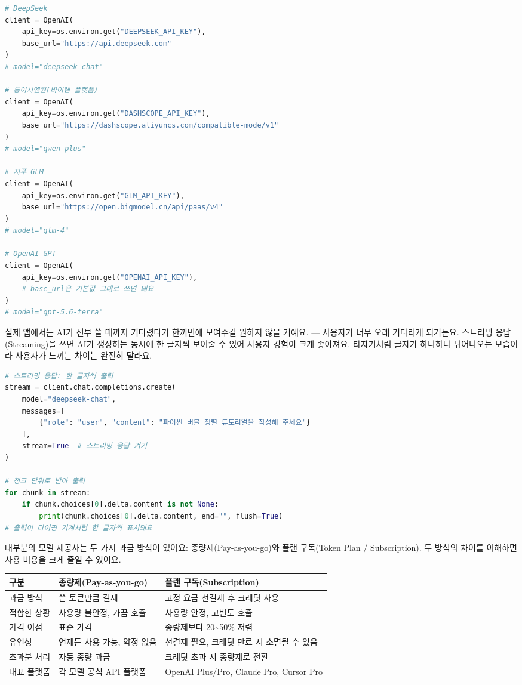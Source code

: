 \begin{lstlisting}[language=Python]
# DeepSeek
client = OpenAI(
    api_key=os.environ.get("DEEPSEEK_API_KEY"),
    base_url="https://api.deepseek.com"
)
# model="deepseek-chat"

# 퉁이치엔원(바이롄 플랫폼)
client = OpenAI(
    api_key=os.environ.get("DASHSCOPE_API_KEY"),
    base_url="https://dashscope.aliyuncs.com/compatible-mode/v1"
)
# model="qwen-plus"

# 지푸 GLM
client = OpenAI(
    api_key=os.environ.get("GLM_API_KEY"),
    base_url="https://open.bigmodel.cn/api/paas/v4"
)
# model="glm-4"

# OpenAI GPT
client = OpenAI(
    api_key=os.environ.get("OPENAI_API_KEY"),
    # base_url은 기본값 그대로 쓰면 돼요
)
# model="gpt-5.6-terra"
\end{lstlisting}


실제 앱에서는 AI가 전부 쓸 때까지 기다렸다가 한꺼번에 보여주길 원하지 않을 거예요. — 사용자가 너무 오래 기다리게 되거든요. 스트리밍 응답(Streaming)을 쓰면 AI가 생성하는 동시에 한 글자씩 보여줄 수 있어 사용자 경험이 크게 좋아져요. 타자기처럼 글자가 하나하나 튀어나오는 모습이라 사용자가 느끼는 차이는 완전히 달라요.

\begin{lstlisting}[language=Python]
# 스트리밍 응답: 한 글자씩 출력
stream = client.chat.completions.create(
    model="deepseek-chat",
    messages=[
        {"role": "user", "content": "파이썬 버블 정렬 튜토리얼을 작성해 주세요"}
    ],
    stream=True  # 스트리밍 응답 켜기
)

# 청크 단위로 받아 출력
for chunk in stream:
    if chunk.choices[0].delta.content is not None:
        print(chunk.choices[0].delta.content, end="", flush=True)
# 출력이 타이핑 기계처럼 한 글자씩 표시돼요
\end{lstlisting}


대부분의 모델 제공사는 두 가지 과금 방식이 있어요: 종량제(Pay-as-you-go)와 플랜 구독(Token Plan / Subscription). 두 방식의 차이를 이해하면 사용 비용을 크게 줄일 수 있어요.


\begin{center}
\begin{tabularx}{\linewidth}{|X|X|X|}
\hline
\textbf{구분} & \textbf{종량제(Pay-as-you-go)} & \textbf{플랜 구독(Subscription)} \tabularnewline
\hline
과금 방식 & 쓴 토큰만큼 결제 & 고정 요금 선결제 후 크레딧 사용 \tabularnewline
적합한 상황 & 사용량 불안정, 가끔 호출 & 사용량 안정, 고빈도 호출 \tabularnewline
가격 이점 & 표준 가격 & 종량제보다 20\textasciitilde{}50\% 저렴 \tabularnewline
유연성 & 언제든 사용 가능, 약정 없음 & 선결제 필요, 크레딧 만료 시 소멸될 수 있음 \tabularnewline
초과분 처리 & 자동 종량 과금 & 크레딧 초과 시 종량제로 전환 \tabularnewline
대표 플랫폼 & 각 모델 공식 API 플랫폼 & OpenAI Plus/Pro, Claude Pro, Cursor Pro \tabularnewline
\hline
\end{tabularx}
\end{center}

